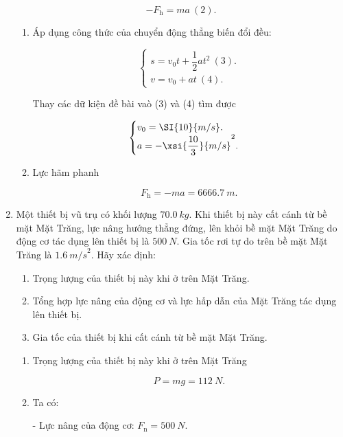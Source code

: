 \begin{enumerate}[label=\bfseries Câu \arabic*:]
{		$$ - F_\text{h} = ma\ (2).$$
		
		\begin{enumerate}[label=\alph*)]
			\item Áp dụng công thức của chuyển động thẳng biến đổi đều:
			
			$$\begin{cases}
				s = v_0t+ \dfrac{1}{2}at^2\ (3).\\
				v = v_0 +at\ (4).
			\end{cases}$$
		
			Thay các dữ kiện đề bài vaò (3) và (4) tìm được
			
			$$\begin{cases}
				v_0 = \SI{10}{m/s}.\\
				a = - \xsi{\dfrac{10}{3}}{m/s}^2.
			\end{cases}$$
			\item Lực hãm phanh
			
			$$F_\text{h} = -ma = \SI{6666,7}{m}.$$
		\end{enumerate}
	}
	\item {}
	
	
	{
		Một thiết bị vũ trụ có khối lượng $\SI{70,0}{kg}$. Khi thiết bị này cất cánh từ bề mặt Mặt Trăng, lực nâng hướng thẳng đứng, lên khỏi bề mặt Mặt Trăng do động cơ tác dụng lên thiết bị là $\SI{500}{N}$. Gia tốc rơi tự do trên bề mặt Mặt Trăng là $\SI{1,6}{m/s}^2$. Hãy xác định:
		\begin{enumerate}[label=\alph*)]
			\item  Trọng lượng của thiết bị này khi ở trên Mặt Trăng.
			
			\item Tổng hợp lực nâng của động cơ và lực hấp dẫn của Mặt Trăng tác dụng lên thiết bị.
			
			\item Gia tốc của thiết bị khi cất cánh từ bề mặt Mặt Trăng.
			
		\end{enumerate}
	}
	
	\hideall
	{
		\begin{enumerate}[label=\alph*)]
			\item  Trọng lượng của thiết bị này khi ở trên Mặt Trăng
			
			$$P = mg = \SI{112}{N}.$$
			
			\item Ta có:
			
			- Lực nâng của động cơ: $F_\text{n} = \SI{500}{N}.$
			

\end{enumerate}}
\end{enumerate}
